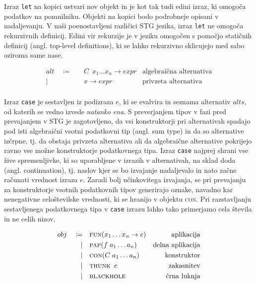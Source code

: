 Izraz \texttt{let} na kopici ustvari nov objekt in je kot tak tudi edini izraz, ki omogoča  podatkov na pomnilniku. Objekti na kopici bodo podrobneje opisani v nadaljevanju. V naši poenostavljeni različici STG jezika, izraz \texttt{let} ne omogoča rekurzivnih definicij. Edini vir rekurzije je v jeziku omogočen s pomočjo statičnih definicij (angl. top-level definitions), ki se lahko rekurzivno sklicujejo med sabo oziroma same nase.

\begin{align*}
	alt \quad \coloneq& \quad C \enspace x_1 \dots x_n \to expr & \text{algebraična alternativa}\\
	\vert& \quad x \to expr & \text{privzeta alternativa}\\
\end{align*}

Izraz \texttt{case} je sestavljen iz podizraza $e$, ki se evalvira in seznama alternativ $alts$, od katerih se vedno izvede \textit{natanko ena}. S preverjanjem tipov v fazi pred prevajanjem v STG je zagotovljeno, da vsi konstruktorji pri alternativah spadajo pod isti algebraični vsotni podatkovni tip (angl. sum type) in da so alternative izčrpne, tj. da obstaja privzeta alternativa ali da algebraične alternative pokrijejo ravno vse možne konstruktorje podatkovnega tipa. Izraz \texttt{case} najprej shrani vse žive spremenljivke, ki so uporabljene v izrazih v alternativah, na sklad doda  (angl. continuation), tj. naslov kjer se bo izvajanje nadaljevalo in nato začne računati vrednost izraza $e$. Zaradi bolj učinkovitega izvajanja, se pri prevajanju za konstruktorje vsotnih podatkovnih tipov generirajo oznake, navadno kar nenegativne celoštevilske vrednosti, ki se hranijo v objektu \textsc{con}. Pri razstavljanju sestavljenega podatkovnega tipa v \texttt{case} izrazu lahko tako primerjamo cela števila in ne celih nizov.

\begin{align*}
	obj \quad \coloneq& \quad \textsc{fun}(x_1 \dots x_n \to e) & \text{aplikacija}\\
	\vert& \quad \textsc{pap}(f \; a_1 \dots a_n) & \text{delna aplikacija}\\
	\vert& \quad \textsc{con}(C \; a_1 \dots a_n) & \text{konstruktor}\\
	\vert& \quad \textsc{thunk} \enspace e & \text{zakasnitev}\\
	\vert& \quad \textsc{blackhole} & \text{črna luknja}
\end{align*}

